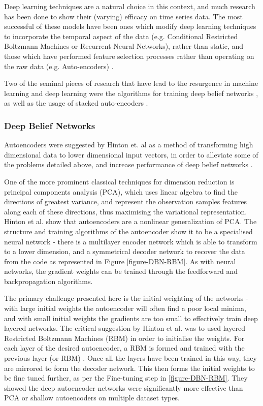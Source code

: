 \documentclass[a4paper,11pt,oneside]{article}
\theoremstyle{plain}
\theoremstyle{definition}
\begin{document}
Deep learning techniques are a natural choice in this context, and much research has been done to show their 
(varying) efficacy on time series data. The most successful of these models have been ones which modify deep 
learning techniques to incorporate the temporal aspect of the data (e.g. Conditional Restricted Boltzmann 
Machines or Recurrent Neural Networks), rather than static, and those which have performed feature selection
 processes rather than operating on the raw data (e.g. Auto-encoders)  \cite{Langkvist}. 
 \hfill \break 
 
 
Two of the seminal pieces of research that have lead to the resurgence in machine learning and deep learning 
were the algorithms for training deep belief networks \cite{Hinton1}, as well as the usage of stacked auto-encoders
\cite{Ranzato1, Bengio1}. 

 
\subsubsection{Deep Belief Networks}\label{DBN}
 
 Autoencoders were suggested by Hinton et. al as a method of transforming high dimensional 
 data to lower dimensional input vectors, in order to alleviate some of the problems detailed above, and increase 
 performance of deep belief networks \cite{Hinton2}.
\hfill \break 

One of the more prominent classical techniques for dimension reduction is principal components analysis (PCA), 
which uses linear algebra to find the directions of greatest variance, and represent the observation samples 
features along each of these directions, thus maximising the variational representation. Hinton et al. show that 
autoencoders are a nonlinear generalization of PCA. The structure and training algorithms of the autoencoder 
show it to be a specialised neural network - there is a multilayer encoder network which is able to transform to a 
lower dimension, and a symmetrical decoder network to recover the data from the code as represented in Figure \ref{figure-DBN-RBM}. As with 
neural networks, the gradient weights can be trained through the feedforward and backpropagation algorithms.  
\hfill \break 

The primary challenge presented here is the initial weighting of the networks - with large initial weights the 
autoencoder will often find a poor local minima, and with small initial weights the gradients are too small to 
effectively train deep layered networks. The critical suggestion by Hinton et al. was to used layered Restricted 
Boltzmann Machines (RBM) in order to initialise the weights. For each layer of the desired autoencoder, a RBM is 
formed and trained with the previous layer (or RBM) \cite{Hinton3}. Once all the layers have been 
trained in this way, they are mirrored to form the decoder network. This then forms the initial weights to be fine 
tuned further, as per the Fine-tuning step in \ref{figure-DBN-RBM}. They showed the deep autoencoder networks were significantly more 
effective than PCA or shallow autoencoders on multiple dataset types. 
 \hfill \break 
 
\end{document}
